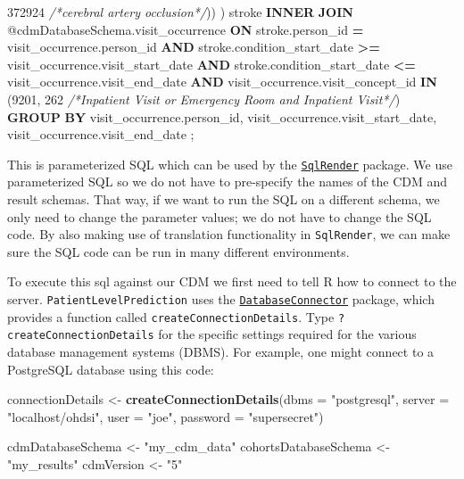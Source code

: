 \documentclass[
]{article}
\newenvironment{Shaded}{\begin{snugshade}}{\end{snugshade}}
\newcommand{\AttributeTok}[1]{\textcolor[rgb]{0.13,0.29,0.53}{#1}}
\newcommand{\CommentTok}[1]{\textcolor[rgb]{0.56,0.35,0.01}{\textit{#1}}}
\newcommand{\DecValTok}[1]{\textcolor[rgb]{0.00,0.00,0.81}{#1}}
\newcommand{\FunctionTok}[1]{\textcolor[rgb]{0.13,0.29,0.53}{\textbf{#1}}}
\newcommand{\KeywordTok}[1]{\textcolor[rgb]{0.13,0.29,0.53}{\textbf{#1}}}
\newcommand{\NormalTok}[1]{#1}
\newcommand{\OperatorTok}[1]{\textcolor[rgb]{0.81,0.36,0.00}{\textbf{#1}}}
\newcommand{\OtherTok}[1]{\textcolor[rgb]{0.56,0.35,0.01}{#1}}
\newcommand{\StringTok}[1]{\textcolor[rgb]{0.31,0.60,0.02}{#1}}
\begin{document}
\begin{Shaded}
\begin{Highlighting}[]
  \DecValTok{372924} \CommentTok{/*cerebral artery occlusion*/}\NormalTok{))}
\NormalTok{  ) stroke}
  \KeywordTok{INNER} \KeywordTok{JOIN}\NormalTok{ @cdmDatabaseSchema.visit\_occurrence}
  \KeywordTok{ON}\NormalTok{ stroke.person\_id }\OperatorTok{=}\NormalTok{ visit\_occurrence.person\_id}
  \KeywordTok{AND}\NormalTok{ stroke.condition\_start\_date }\OperatorTok{\textgreater{}=}\NormalTok{ visit\_occurrence.visit\_start\_date}
  \KeywordTok{AND}\NormalTok{ stroke.condition\_start\_date }\OperatorTok{\textless{}=}\NormalTok{ visit\_occurrence.visit\_end\_date}
  \KeywordTok{AND}\NormalTok{ visit\_occurrence.visit\_concept\_id }\KeywordTok{IN}\NormalTok{ (}\DecValTok{9201}\NormalTok{, }\DecValTok{262} \CommentTok{/*\textquotesingle{}Inpatient Visit\textquotesingle{}  or }
\CommentTok{  \textquotesingle{}Emergency Room and Inpatient Visit\textquotesingle{}*/}\NormalTok{)}
  \KeywordTok{GROUP} \KeywordTok{BY}\NormalTok{ visit\_occurrence.person\_id, visit\_occurrence.visit\_start\_date, }
\NormalTok{  visit\_occurrence.visit\_end\_date}
\NormalTok{  ;}
  
\end{Highlighting}
\end{Shaded}

This is parameterized SQL which can be used by the
\href{http://github.com/OHDSI/SqlRender}{\texttt{SqlRender}} package. We
use parameterized SQL so we do not have to pre-specify the names of the
CDM and result schemas. That way, if we want to run the SQL on a
different schema, we only need to change the parameter values; we do not
have to change the SQL code. By also making use of translation
functionality in \texttt{SqlRender}, we can make sure the SQL code can
be run in many different environments.

To execute this sql against our CDM we first need to tell R how to
connect to the server. \texttt{PatientLevelPrediction} uses the
\href{http://github.com/ohdsi/DatabaseConnector}{\texttt{DatabaseConnector}}
package, which provides a function called
\texttt{createConnectionDetails}. Type \texttt{?createConnectionDetails}
for the specific settings required for the various database management
systems (DBMS). For example, one might connect to a PostgreSQL database
using this code:

\begin{Shaded}
\begin{Highlighting}[]
\NormalTok{  connectionDetails }\OtherTok{\textless{}{-}} \FunctionTok{createConnectionDetails}\NormalTok{(}\AttributeTok{dbms =} \StringTok{"postgresql"}\NormalTok{, }
  \AttributeTok{server =} \StringTok{"localhost/ohdsi"}\NormalTok{, }
  \AttributeTok{user =} \StringTok{"joe"}\NormalTok{, }
  \AttributeTok{password =} \StringTok{"supersecret"}\NormalTok{)}
  
\NormalTok{  cdmDatabaseSchema }\OtherTok{\textless{}{-}} \StringTok{"my\_cdm\_data"}
\NormalTok{  cohortsDatabaseSchema }\OtherTok{\textless{}{-}} \StringTok{"my\_results"}
\NormalTok{  cdmVersion }\OtherTok{\textless{}{-}} \StringTok{"5"}
\end{Highlighting}
\end{Shaded}
\end{document}
